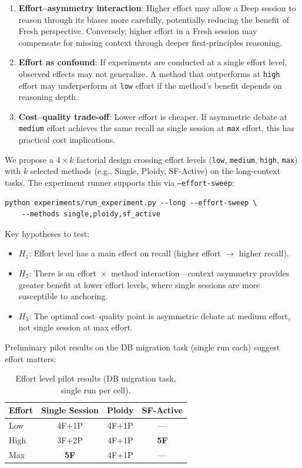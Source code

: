 \documentclass[11pt]{article}
\begin{document}
\begin{enumerate}[label=\arabic*., leftmargin=1.5em]
  \item \textbf{Effort--asymmetry interaction}: Higher effort may allow a Deep session to reason through its biases more carefully, potentially reducing the benefit of Fresh perspective. Conversely, higher effort in a Fresh session may compensate for missing context through deeper first-principles reasoning.
  \item \textbf{Effort as confound}: If experiments are conducted at a single effort level, observed effects may not generalize. A method that outperforms at \texttt{high} effort may underperform at \texttt{low} effort if the method's benefit depends on reasoning depth.
  \item \textbf{Cost--quality trade-off}: Lower effort is cheaper. If asymmetric debate at \texttt{medium} effort achieves the same recall as single session at \texttt{max} effort, this has practical cost implications.
\end{enumerate}

We propose a $4 \times k$ factorial design crossing effort levels (\texttt{low}, \texttt{medium}, \texttt{high}, \texttt{max}) with $k$ selected methods (e.g., Single, Ploidy, SF-Active) on the long-context tasks. The experiment runner supports this via \texttt{--effort-sweep}:

\begin{lstlisting}
python experiments/run_experiment.py --long --effort-sweep \
    --methods single,ploidy,sf_active
\end{lstlisting}

Key hypotheses to test:
\begin{itemize}[leftmargin=1.5em]
  \item $H_1$: Effort level has a main effect on recall (higher effort $\to$ higher recall).
  \item $H_2$: There is an effort~$\times$~method interaction---context asymmetry provides greater benefit at lower effort levels, where single sessions are more susceptible to anchoring.
  \item $H_3$: The optimal cost--quality point is asymmetric debate at medium effort, not single session at max effort.
\end{itemize}

Preliminary pilot results on the DB migration task (single run each) suggest effort matters:

\begin{table}[H]
\centering
\caption{Effort level pilot results (DB migration task, single run per cell).}
\label{tab:effort-pilot}
\small
\begin{tabular}{@{}lccc@{}}
\toprule
\textbf{Effort} & \textbf{Single Session} & \textbf{Ploidy} & \textbf{SF-Active} \\
\midrule
Low  & 4F+1P & 4F+1P & ---   \\
High & 3F+2P & 4F+1P & \textbf{5F} \\
Max  & \textbf{5F}    & 4F+1P & ---   \\
\bottomrule
\end{tabular}
\end{table}
\end{document}
